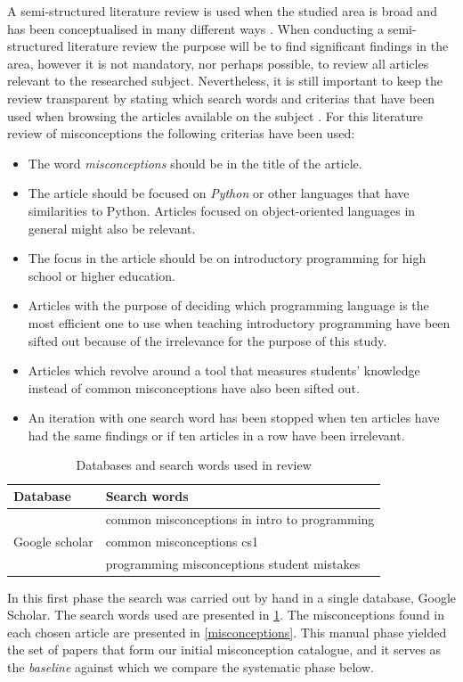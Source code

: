 A semi-structured literature review is used when the studied area is broad and
has been conceptualised in many different ways \autocite{Snyder2019}. When
conducting a semi-structured literature review the purpose will be to find 
significant findings in the area, however it is not mandatory, nor perhaps 
possible, to review all articles relevant to the researched subject. 
Nevertheless, it is still important to keep the review transparent by stating 
which search words and criterias that have been used when browsing the articles 
available on the subject \autocite{Snyder2019}.
For this literature review of misconceptions the following criterias have 
been used:
\begin{itemize}
\item The word \emph{misconceptions} should be in the title of the article.
\item The article should be focused on \emph{Python} or other languages that 
have similarities to Python. Articles focused on object-oriented languages 
in 
general might also be relevant.
\item The focus in the article should be on introductory programming for 
high 
school or higher education.
\item Articles with the purpose of deciding which programming language is 
the 
most efficient one to use when teaching introductory programming have been 
sifted out because of the irrelevance for the purpose of this study.
\item Articles which revolve around a tool that measures students' knowledge 
instead of common misconceptions have also been sifted out.
\item An iteration with one search word has been stopped when ten articles 
have had the same findings or if ten articles in a row have been irrelevant.
\end{itemize}
\begin{table}[h]
\centering
\begin{tabular}{ll}
\toprule
Database & Search words\\
\midrule
\multirow{3}{4em}{Google scholar} & common misconceptions in intro to 
programming \\
& common misconceptions cs1 \\
& programming misconceptions student mistakes \\
\bottomrule
\end{tabular}
\caption{Databases and search words used in review}
\label{databasesandwords}
\end{table}
In this first phase the search was carried out by hand in a single database,
Google Scholar. The search words used are presented in \cref{databasesandwords}.
The misconceptions found in each chosen article are presented in
\cref{misconceptions}. This manual phase yielded the set of papers that form our
initial misconception catalogue, and it serves as the \emph{baseline} against
which we compare the systematic phase below.

